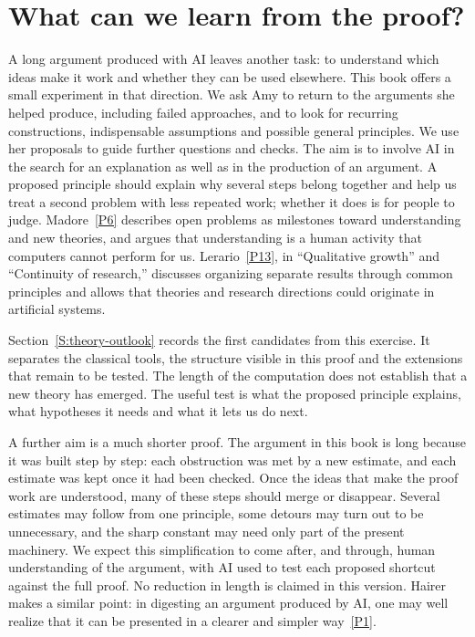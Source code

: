\section*{What can we learn from the proof?}

A long argument produced with AI leaves another task: to understand which
ideas make it work and whether they can be used elsewhere. This book offers a
small experiment in that direction. We ask Amy to return to the arguments she
helped produce, including failed approaches, and to look for recurring
constructions, indispensable assumptions and possible general principles. We use
her proposals to guide further questions and checks. The aim is to involve AI in
the search for an explanation as well as in the production of an argument. A
proposed principle should explain why several steps belong together and help us
treat a second problem with less repeated work; whether it does is for people
to judge. Madore~\hyperlink{pp:P6}{[P6]} describes open problems as milestones
toward understanding and new theories, and argues that understanding is a human
activity that computers cannot perform for us.
Lerario~\hyperlink{pp:P13}{[P13]}, in ``Qualitative growth'' and ``Continuity
of research,'' discusses organizing separate results through common principles
and allows that theories and research directions could originate in artificial
systems.

Section~\ref{S:theory-outlook} records the first candidates from this exercise.
It separates the classical tools, the structure visible in this proof and the
extensions that remain to be tested. The length of the computation does not
establish that a new theory has emerged. The useful test is what the proposed
principle explains, what hypotheses it needs and what it lets us do next.

A further aim is a much shorter proof. The argument in this book is long
because it was built step by step: each obstruction was met by a new estimate,
and each estimate was kept once it had been checked. Once the ideas that make
the proof work are understood, many of these steps should merge or disappear.
Several estimates may follow from one principle, some detours may turn out to
be unnecessary, and the sharp constant may need only part of the present
machinery. We expect this simplification to come after, and through, human
understanding of the argument, with AI used to test each proposed shortcut
against the full proof. No reduction in length is claimed in this version.
Hairer makes a similar point: in digesting an argument produced by AI, one may
well realize that it can be presented in a clearer and simpler
way~\hyperlink{pp:P1}{[P1]}.

